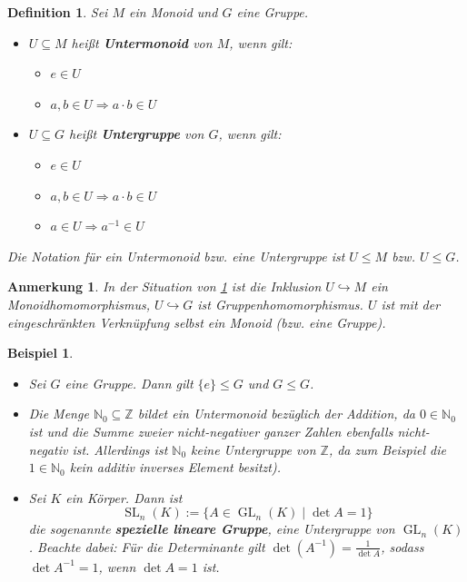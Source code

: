 \documentclass[a4paper, twoside, 11pt, ngerman]{report}
\newcommand{\NN}{\mathds N}
\newcommand{\ZZ}{\mathds Z}
\DeclareMathOperator{\GL}{GL}
\DeclareMathOperator{\SL}{SL}
\theoremstyle{definistyle}
\newtheorem{defini}[satz]{Definition}
\newtheorem{anm}[satz]{Anmerkung}
\newtheorem{bsp}[satz]{Beispiel}
\theoremstyle{remark}
\newcommand{\defn}[1]{\textit{\bfseries #1}}
\begin{document}
\begin{defini}\label{def:untermonoid_und_untergruppe}
Sei $M$ ein Monoid und $G$ eine Gruppe.
\begin{itemize}
    \item $U \subseteq M$ heißt \defn{Untermonoid} von $M$, wenn gilt:
    \begin{itemize}
        \item[(UM1)] $e \in U$
        \item[(UM2)] $a, b \in U \Rightarrow a \cdot b \in U$
    \end{itemize}
    \item $U \subseteq G$ heißt \defn{Untergruppe} von $G$, wenn gilt:
    \begin{itemize}
        \item[(UG1)] $e \in U$
        \item[(UG2)] $a, b \in U \Rightarrow a \cdot b \in U$ 
        \item[(UG3)] $a \in U \Rightarrow a^{-1} \in U$
    \end{itemize}
\end{itemize}
Die Notation für ein Untermonoid bzw. eine Untergruppe ist $U \leq M$ bzw. $U \leq G$.
\end{defini}


\begin{anm}\label{bem:inklusion_homomorphismus}
In der Situation von \ref{def:untermonoid_und_untergruppe} ist die Inklusion $U \hookrightarrow M$ ein Monoidhomomorphismus, $U \hookrightarrow G$ ist Gruppenhomomorphismus.
$U$ ist mit der eingeschränkten Verknüpfung selbst ein Monoid (bzw. eine Gruppe).
\end{anm}

\begin{bsp}\label{bsp:untermonoid_und_untergruppe}
\begin{itemize}
    \item[(a)] Sei $G$ eine Gruppe. Dann gilt $\{e\}\leq G$ und $G\leq G$.   
    \item[(b)] Die Menge $\NN_0 \subseteq \ZZ$ bildet ein Untermonoid bezüglich der Addition, da $0 \in \NN_0$ ist und die Summe zweier nicht-negativer ganzer Zahlen ebenfalls nicht-negativ ist. Allerdings ist $\NN_0$ keine Untergruppe von $\ZZ$, da zum Beispiel die $1 \in \NN_0$ kein additiv inverses Element besitzt).   
    \item[(c)] Sei $K$ ein Körper. Dann ist \[\SL_n(K) := \{ A \in \GL_n(K) \mid \det A = 1 \}\] die sogenannte \defn{spezielle lineare Gruppe}, eine Untergruppe von $\GL_n(K)$. Beachte dabei: Für die Determinante gilt $\det(A^{-1}) = \frac{1}{\det A}$, sodass $\det A^{-1} = 1$, wenn $\det A = 1$ ist.
\end{itemize}
\end{bsp}
\end{document}
